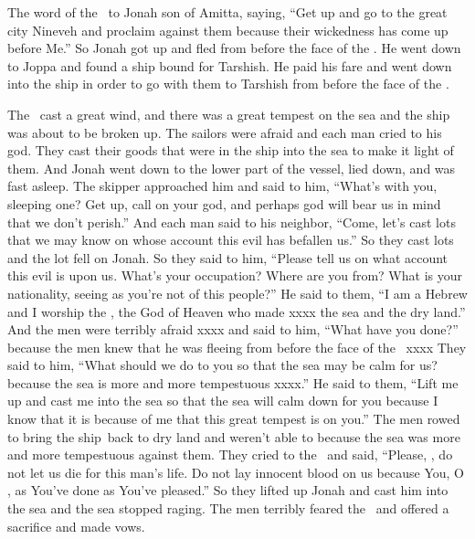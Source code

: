 
\begin{inparaenum}
   The word of the \lord\ to Jonah son of Amitta, saying,%
   ``Get up and go to the great city Nineveh and proclaim against them because their wickedness has come up before Me.''%
   So Jonah got up  and fled from before the face of the \lord. He went down to Joppa and found a ship bound for Tarshish. He paid his fare and went down into the ship in order to go with them to Tarshish from before the face of the \lord.%

   The \lord\ cast a great wind, and there was a great tempest on the sea and the ship was about to be broken up.%
   The sailors were afraid and each man cried to his god. They cast their goods that were in the ship into the sea to make it light of them. And Jonah went down to the lower part of the vessel, lied down, and was fast asleep.%
   The skipper approached him and said to him, ``What's with you, sleeping one? Get up, call on your god, and perhaps god will bear us in mind that we don't perish.''%
   And each man said to his neighbor, ``Come, let's cast lots that we may know on whose account this evil has befallen us.'' So they cast lots and the lot fell on Jonah.%
   So they said to him, ``Please tell us on what account this evil is upon us. What's your occupation? Where are you from? What is your nationality, seeing as you're not of this people?''%
   He said to them, ``I am a Hebrew and I worship the \lord, the God of Heaven who made xxxx the sea and the dry land.''%
   And the men were terribly afraid xxxx and said to him, ``What have you done?'' because the men knew that he was fleeing from before the face of the \lord\ xxxx%
   They said to him, ``What should we do to you so that the sea may be calm for us? because the sea is more and more tempestuous xxxx.''%
   He said to them, ``Lift me up and cast me into the sea so that the sea will calm down for you because I know that it is because of me that this great tempest is on you.''%
   The men rowed to bring the ship\understood{}\ back to dry land and weren't able to because the sea was more and more tempestuous against them.%
   They cried to the \lord\ and said, ``Please, \lord, do not let us die for this man's life. Do not lay innocent blood on us because You, O \lord, as You've done as You've pleased.''%
   So they lifted up Jonah and cast him into the sea and the sea stopped raging.%
   The men terribly feared the \lord\ and offered a sacrifice and made vows.%
\end{inparaenum}
